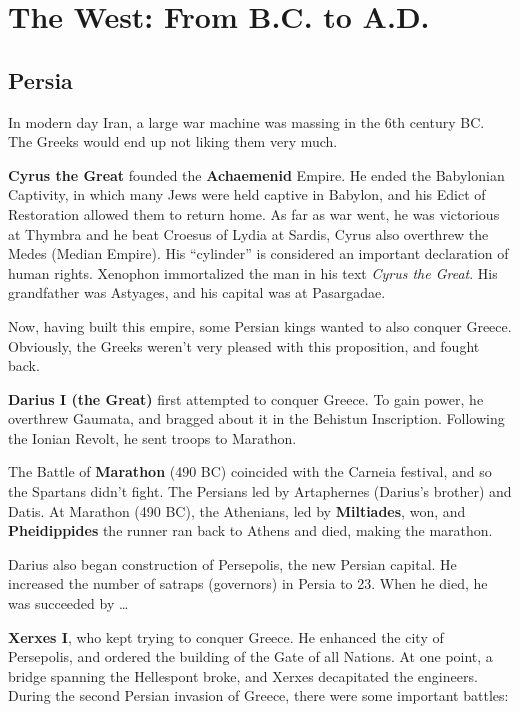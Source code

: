 \chapter{The West: From B.C. to A.D.}

\section{Persia}

In modern day Iran, a large war machine was massing in the 6th century BC\@.
The Greeks would end up not liking them very much.

\textbf{Cyrus the Great} founded the \textbf{Achaemenid} Empire.
He ended the Babylonian Captivity, in which many Jews were held captive in Babylon,
and his Edict of Restoration allowed them to return home.
As far as war went, he was victorious at Thymbra and he beat Croesus of Lydia at Sardis,
Cyrus also overthrew the Medes (Median Empire).
His ``cylinder'' is considered an important declaration of human rights.
Xenophon immortalized the man in his text \textit{Cyrus the Great}.
His grandfather was Astyages, and his capital was at Pasargadae.

Now, having built this empire, some Persian kings wanted to also conquer Greece.
Obviously, the Greeks weren't very pleased with this proposition, and fought back.

\textbf{Darius I (the Great)} first attempted to conquer Greece.
To gain power, he overthrew Gaumata, and bragged about it in the Behistun Inscription.
Following the Ionian Revolt, he sent troops to Marathon.

The Battle of \textbf{Marathon} (490 BC) coincided with the Carneia festival, and so the Spartans didn't fight.
The Persians led by Artaphernes (Darius's brother) and Datis.
At Marathon (490 BC), the Athenians, led by \textbf{Miltiades}, won,
and \textbf{Pheidippides} the runner ran back to Athens and died, making the marathon.

Darius also began construction of Persepolis, the new Persian capital.
He increased the number of satraps (governors) in Persia to 23.
When he died, he was succeeded by \ldots

\textbf{Xerxes I}, who kept trying to conquer Greece.
He enhanced the city of Persepolis, and ordered the building of the Gate of all Nations.
At one point, a bridge spanning the Hellespont broke, and Xerxes decapitated the engineers.
During the second Persian invasion of Greece, there were some important battles:

